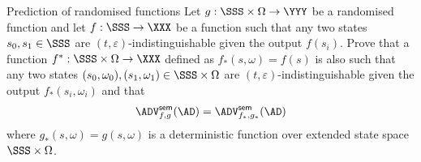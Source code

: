 \documentclass{crypto-exercise}
\author{Sven Laur}
\begin{document}
\begin{exercise}{Prediction of randomised functions}
Let $g:\SSS\times\Omega\to\YYY$ be a randomised function and let $f:\SSS\to\XXX$ be a function such that any two states $s_0,s_1\in\SSS$ are $(t,\varepsilon)$-indistinguishable given the output $f(s_i)$. Prove that a function $f^*:\SSS\times\Omega\to\XXX$ defined as $f_*(s,\omega)=f(s)$ is also such that any two states $(s_0,\omega_0),(s_1,\omega_1)\in\SSS\times\Omega$ are 
$(t,\varepsilon)$-indistinguishable given the output $f_*(s_i,\omega_i)$ and that  
\begin{align*}
\advSemXX{f,g}{\AD}=\advSemXX{f_*,g_*}{\AD}
\end{align*} 
where $g_*(s,\omega)=g(s,\omega)$ is a deterministic function over extended state space $\SSS\times\Omega$.
\end{exercise}
\end{document}
